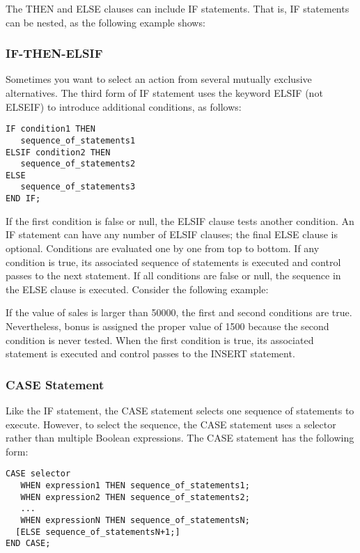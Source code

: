 The THEN and ELSE clauses can include IF statements. That is, IF statements can be nested, as the following example shows:


\subsubsection{IF-THEN-ELSIF}
Sometimes you want to select an action from several mutually exclusive alternatives. The third form of IF statement uses the keyword ELSIF (not ELSEIF) to introduce additional conditions, as follows:
\begin{verbatim}
IF condition1 THEN
   sequence_of_statements1
ELSIF condition2 THEN
   sequence_of_statements2
ELSE
   sequence_of_statements3
END IF;
\end{verbatim}
If the first condition is false or null, the ELSIF clause tests another condition. An IF statement can have any number of ELSIF clauses; the final ELSE clause is optional. Conditions are evaluated one by one from top to bottom. If any condition is true, its associated sequence of statements is executed and control passes to the next statement. If all conditions are false or null, the sequence in the ELSE clause is executed. Consider the following example:



If the value of sales is larger than 50000, the first and second conditions are true. Nevertheless, bonus is assigned the proper value of 1500 because the second condition is never tested. When the first condition is true, its associated statement is executed and control passes to the INSERT statement.

\subsubsection{CASE Statement}
Like the IF statement, the CASE statement selects one sequence of statements to execute. However, to select the sequence, the CASE statement uses a selector rather than multiple Boolean expressions. The CASE statement has the following form:
\begin{verbatim}
CASE selector
   WHEN expression1 THEN sequence_of_statements1;
   WHEN expression2 THEN sequence_of_statements2;
   ...
   WHEN expressionN THEN sequence_of_statementsN;
  [ELSE sequence_of_statementsN+1;]
END CASE;
\end{verbatim}
